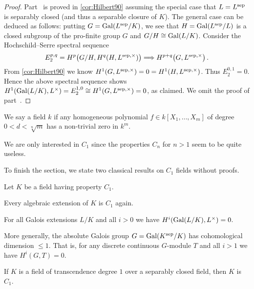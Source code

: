 \begin{proof}
	Part~ is proved in \cref{cor:Hilbert90} assuming the special case that $L=L^{\mathrm{sep}}$ is separably closed (and thus a separable closure of $K$). The general case can be deduced as follows: putting $G=\operatorname{Gal}(L^{\mathrm{sep}}/K)$, we see that $H=\operatorname{Gal}(L^{\mathrm{sep}}/L)$ is a closed subgroup of the pro-finite group $G$ and $G/H\cong \operatorname{Gal}(L/K)$. Consider the Hochschild--Serre spectral sequence
	\begin{equation*}
		E_2^{p,q}=H^p\big(G/H,H^q(H,L^{\sep,\times})\big)\converge H^{p+q}\big(G,L^{\sep,\times}\big)\,.
	\end{equation*}
	From \cref{cor:Hilbert90} we know $H^1(G,L^{\mathrm{sep},\times})=0=H^1(H,L^{\mathrm{sep},\times})$. Thus $E_2^{0,1}=0$. Hence the above spectral sequence shows $H^1(\operatorname{Gal}(L/K),L^\times)=E_2^{1,0}\cong H^1(G,L^{\mathrm{sep},\times})=0$, as claimed. We omit the proof of part~.
\end{proof}
\begin{defi}
	We say a field $k$  if any homogeneous polynomial $f\in k[X_1,\dotsc,X_m]$ of degree $0<d<\sqrt[n]{m}$ has a non-trivial zero in $k^m$.
\end{defi}
\begin{rem}
	We are only interested in $C_1$ since the properties $C_n$ for $n>1$ seem to be quite useless.
\end{rem}
To finish the section, we state two classical results on $C_1$ fields without proofs.
\begin{prop}\label{prop:C1GaloisCoho}
	Let $K$ be a field having property $C_1$.
	\begin{alphanumerate}
		\item Every algebraic extension of $K$ is $C_1$ again.
		\item For all Galois extensions $L/K$ and all $i>0$ we have $H^i(\operatorname{Gal}(L/K),L^{\times})=0$.
		\item More generally, the absolute Galois group $G=\operatorname{Gal}(K^{\mathrm{sep}}/K)$ has cohomological dimension $\leq 1$. That is, for any discrete continuous $G$-module $T$ and all $i>1$ we have $H^i(G,T)=0$.
	\end{alphanumerate}
\end{prop}
\begin{prop}[Tsen]\label{prop:FunctionFieldC1}
	If $K$ is a field of transcendence degree $1$ over a separably closed field, then $K$ is $C_1$.
\end{prop}
